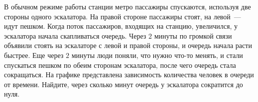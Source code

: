 В обычном режиме работы станции метро пассажиры спускаются, используя две стороны одного эскалатора. На правой стороне пассажиры стоят, на левой~--- идут пешком. Когда поток пассажиров, входящих на станцию, увеличился, у эскалатора начала скапливаться очередь. Через $2$ минуты по громкой связи объявили стоять на эскалаторе с левой и правой стороны, и очередь начала расти быстрее. Еще через $2$ минуты люди поняли, что нужно что-то менять, и стали спускаться пешком по обеим сторонам эскалатора, после чего очередь стала сокращаться. На графике представлена зависимость количества человек в очереди от времени. Найдите, через сколько минут очередь у эскалатора сократится до нуля.
